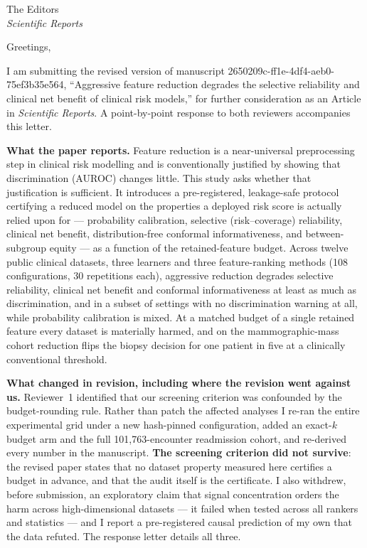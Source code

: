 \documentclass[11pt]{letter}
\begin{document}
\begin{letter}{The Editors\\\textit{Scientific Reports}}
\opening{Greetings,}

I am submitting the revised version of manuscript 2650209c-ff1e-4df4-aeb0-75ef3b35e564,
``Aggressive feature reduction degrades the selective reliability and clinical net benefit of
clinical risk models,'' for further consideration as an Article in \textit{Scientific Reports}. A
point-by-point response to both reviewers accompanies this letter.

\textbf{What the paper reports.} Feature reduction is a near-universal preprocessing step in
clinical risk modelling and is conventionally justified by showing that discrimination (AUROC)
changes little. This study asks whether that justification is sufficient. It introduces a
pre-registered, leakage-safe protocol certifying a reduced model on the properties a deployed risk
score is actually relied upon for --- probability calibration, selective (risk--coverage)
reliability, clinical net benefit, distribution-free conformal informativeness, and between-subgroup
equity --- as a function of the retained-feature budget. Across twelve public clinical datasets,
three learners and three feature-ranking methods (108 configurations, 30 repetitions each),
aggressive reduction degrades selective reliability, clinical net benefit and conformal
informativeness at least as much as discrimination, and in a subset of settings with no
discrimination warning at all, while probability calibration is mixed. At a matched budget of a
single retained feature every dataset is materially harmed, and on the mammographic-mass cohort
reduction flips the biopsy decision for one patient in five at a clinically conventional threshold.

\textbf{What changed in revision, including where the revision went against us.} Reviewer~1
identified that our screening criterion was confounded by the budget-rounding rule. Rather than
patch the affected analyses I re-ran the entire experimental grid under a new hash-pinned
configuration, added an exact-$k$ budget arm and the full 101{,}763-encounter readmission cohort,
and re-derived every number in the manuscript. \textbf{The screening criterion did not survive}: the
revised paper states that no dataset property measured here certifies a budget in advance, and that
the audit itself is the certificate. I also withdrew, before submission, an exploratory claim that
signal concentration orders the harm across high-dimensional datasets --- it failed when tested
across all rankers and statistics --- and I report a pre-registered causal prediction of my own that
the data refuted. The response letter details all three.


\end{letter}
\end{document}
